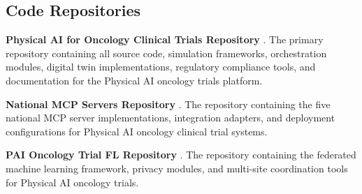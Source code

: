 \subsection*{Code Repositories}

\noindent\textbf{Physical AI for Oncology Clinical Trials Repository}
\cite{main-repo}.
The primary repository containing all source code, simulation frameworks,
orchestration modules, digital twin implementations, regulatory compliance
tools, and documentation for the Physical AI oncology trials platform.

\vspace{0.3cm}
\noindent\textbf{National MCP Servers Repository} \cite{mcp-repo}.
The repository containing the five national MCP server implementations,
integration adapters, and deployment configurations for Physical AI oncology
clinical trial systems.

\vspace{0.3cm}
\noindent\textbf{PAI Oncology Trial FL Repository} \cite{fl-repo}.
The repository containing the federated machine learning framework, privacy
modules, and multi-site coordination tools for Physical AI oncology trials.

